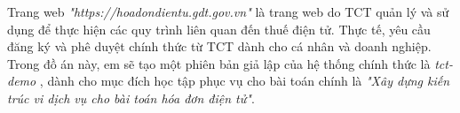 Trang web \emph{"https://hoadondientu.gdt.gov.vn"} là trang web do TCT quản lý và sử dụng để thực hiện các quy trình liên quan đến thuế điện tử. Thực tế, yêu cầu đăng ký và phê duyệt chính thức từ TCT dành cho cá nhân và doanh nghiệp. Trong đồ án này, em sẽ tạo một phiên bản giả lập của hệ thống chính thức là \emph{tct-demo} , dành cho mục đích học tập phục vụ cho bài toán chính là \emph{"Xây dựng kiến trúc vi dịch vụ cho bài toán hóa đơn điện tử"}.